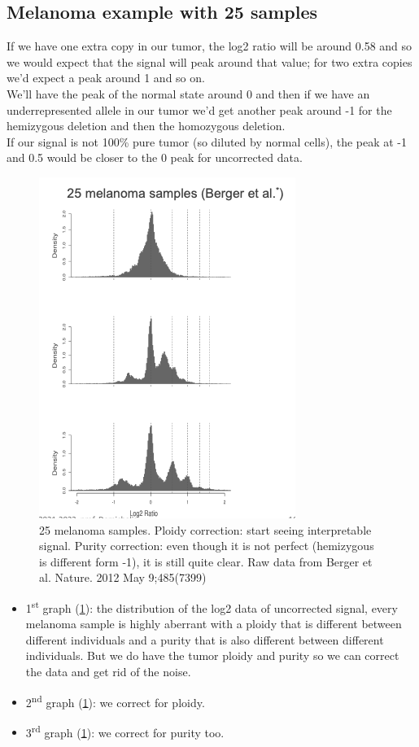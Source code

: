 \subsection{Melanoma example with 25 samples}
 If we have one extra copy in our tumor, the log2 ratio will be around 0.58 and so we would expect that the signal will peak around that value; for two extra  copies we'd expect a peak around 1 and so on.
\\
We'll have the peak of the normal state around 0 and then if we have an underrepresented allele in our tumor we'd get another peak around -1 for the hemizygous deletion and then the homozygous deletion.
\\
If our signal is not 100\% pure tumor (so diluted by normal cells), the peak at -1 and 0.5 would be closer to the 0 peak for uncorrected data.


\begin{figure}[H]
\centering
\includegraphics[width=0.4\linewidth]{image8.png}
\caption{25 melanoma samples. Ploidy correction: start seeing interpretable signal. Purity correction: even though it is not perfect (hemizygous is different form -1), it is still quite clear. Raw data from Berger et al. Nature. 2012 May 9;485(7399)}
\label{fig:ploidy2}
\end{figure}

\begin{itemize}
\item
  1\textsuperscript{st} graph (\ref{fig:ploidy2}): the distribution of the log2 data of uncorrected signal, every melanoma sample is highly aberrant with a ploidy that is different between different individuals and a purity that is also different between different individuals. But we do have the tumor ploidy and purity so we can correct the data and get rid of the noise.
\item
  2\textsuperscript{nd} graph (\ref{fig:ploidy2}): we correct for ploidy.
\item
  3\textsuperscript{rd} graph (\ref{fig:ploidy2}): we correct for purity too.
\end{itemize}

